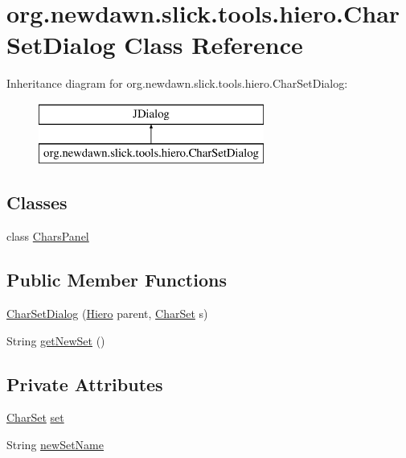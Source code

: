 \hypertarget{classorg_1_1newdawn_1_1slick_1_1tools_1_1hiero_1_1_char_set_dialog}{}\section{org.\+newdawn.\+slick.\+tools.\+hiero.\+Char\+Set\+Dialog Class Reference}
\label{classorg_1_1newdawn_1_1slick_1_1tools_1_1hiero_1_1_char_set_dialog}
Inheritance diagram for org.\+newdawn.\+slick.\+tools.\+hiero.\+Char\+Set\+Dialog\+:\begin{figure}[H]
\begin{center}
\leavevmode
\includegraphics[height=2.000000cm]{classorg_1_1newdawn_1_1slick_1_1tools_1_1hiero_1_1_char_set_dialog}
\end{center}
\end{figure}
\subsection*{Classes}
\begin{DoxyCompactItemize}
\item 
class \mbox{\hyperlink{classorg_1_1newdawn_1_1slick_1_1tools_1_1hiero_1_1_char_set_dialog_1_1_chars_panel}{Chars\+Panel}}
\end{DoxyCompactItemize}
\subsection*{Public Member Functions}
\begin{DoxyCompactItemize}
\item 
\mbox{\hyperlink{classorg_1_1newdawn_1_1slick_1_1tools_1_1hiero_1_1_char_set_dialog_ad98e518276c347b0735f423346969033}{Char\+Set\+Dialog}} (\mbox{\hyperlink{classorg_1_1newdawn_1_1slick_1_1tools_1_1hiero_1_1_hiero}{Hiero}} parent, \mbox{\hyperlink{classorg_1_1newdawn_1_1slick_1_1tools_1_1hiero_1_1_char_set}{Char\+Set}} s)
\item 
String \mbox{\hyperlink{classorg_1_1newdawn_1_1slick_1_1tools_1_1hiero_1_1_char_set_dialog_a2f4151632bd5b7d66bc342671e13c303}{get\+New\+Set}} ()
\end{DoxyCompactItemize}
\subsection*{Private Attributes}
\begin{DoxyCompactItemize}
\item 
\mbox{\hyperlink{classorg_1_1newdawn_1_1slick_1_1tools_1_1hiero_1_1_char_set}{Char\+Set}} \mbox{\hyperlink{classorg_1_1newdawn_1_1slick_1_1tools_1_1hiero_1_1_char_set_dialog_a8d1a0382707d44e97fe2e3b0edaa9728}{set}}
\item 
String \mbox{\hyperlink{classorg_1_1newdawn_1_1slick_1_1tools_1_1hiero_1_1_char_set_dialog_ab55224706d481bb64c291389c69e65c3}{new\+Set\+Name}}
\end{DoxyCompactItemize}



